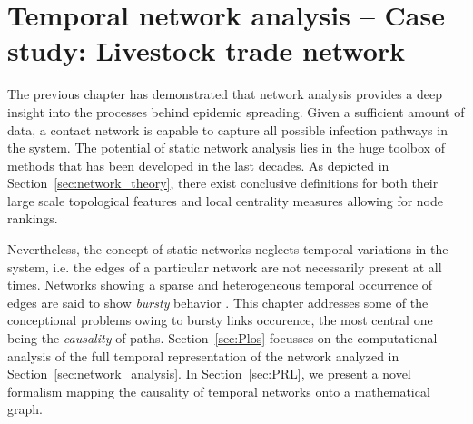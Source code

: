 \chapter{Temporal network analysis -- Case study: Livestock trade network}\label{sec:temporal_networks}
The previous chapter has demonstrated that network analysis provides a deep insight into the processes behind epidemic spreading.
Given a sufficient amount of data, a contact network is capable to capture all possible infection pathways in the system.
The potential of static network analysis lies in the huge toolbox of methods that has been developed in the last decades.
As depicted in Section~\ref{sec:network_theory}, there exist conclusive definitions for both their large scale topological features and local centrality measures allowing for node rankings.

Nevertheless, the concept of static networks neglects temporal variations in the system, i.e. the edges of a particular network are not necessarily present at all times.
Networks showing a sparse and heterogeneous temporal occurrence of edges are said to show \emph{bursty} behavior \citep{Holme_review}.
This chapter addresses some of the conceptional problems owing to bursty links occurence, the most central one being the \emph{causality} of paths.
Section~\ref{sec:Plos} focusses on the computational analysis of the full temporal representation of the network analyzed in Section~\ref{sec:network_analysis}.
In Section~\ref{sec:PRL}, we present a novel formalism mapping the causality of temporal networks onto a mathematical graph.

